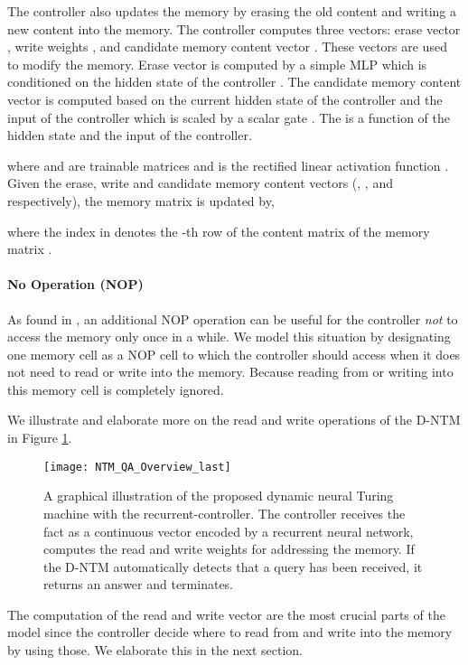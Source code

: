 \documentclass[12pt]{article}
\begin{document}
The controller also updates the memory by erasing the old content and writing a new content into the memory. The controller computes three vectors: erase vector , write weights , and candidate memory content vector . These vectors are used to modify the memory. Erase vector is computed by a simple MLP which is conditioned on the hidden state of the controller . The candidate memory content vector  is computed based on the current hidden state of the controller  and the input of the controller which is scaled by a scalar gate . The  is a function of the hidden state and the input of the controller. 

where  and  are trainable matrices and  is the rectified linear activation function \citep{nair2010rectified}. Given the erase, write and candidate memory content vectors (, , and  respectively), the memory matrix is updated by,

where the index  in  denotes the -th row of the content matrix  of the memory matrix .

\paragraph{No Operation (NOP)}

As found in \citep{joulin2015inferring}, an additional NOP operation can be useful
for the controller {\it not} to access the memory only once in a while. We model
this situation by designating one memory cell as a NOP cell to which the controller should
access when it does not need to read or write into the memory. Because reading from or writing
into this memory cell is completely ignored. 

We illustrate and elaborate more on the read and write operations of the D-NTM in Figure \ref{fig_main}.

\begin{figure}[htbp]
\centering
\texttt{[image: NTM\_QA\_Overview\_last]}
\caption{A graphical illustration of the proposed dynamic neural Turing machine with the 
    recurrent-controller.  The controller receives the fact as a
    continuous vector encoded by a recurrent neural network, computes the
    read and write weights for addressing the memory. If the D-NTM automatically
    detects that a query has been received, it returns an answer
    and terminates.}
\label{fig_main}
\end{figure}

The computation of the read  and write vector  are the most crucial parts of the model since the controller decide where to read from and write into the memory by using those. We elaborate this in the next section. 
\end{document}
